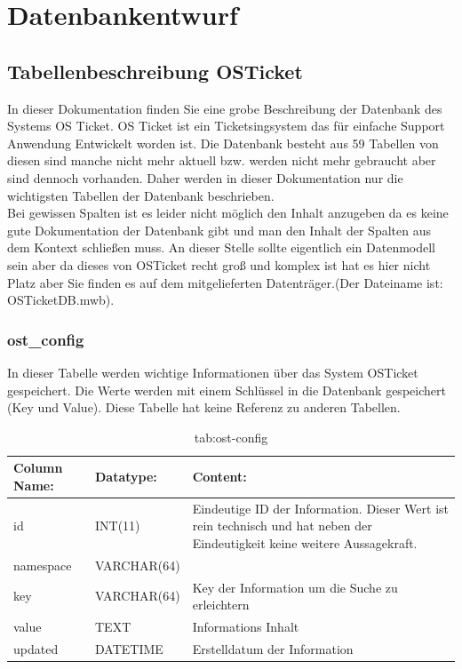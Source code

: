 \newpage
\section{Datenbankentwurf}
\def \currentAuthor{Elias Gabl}

\subsection{Tabellenbeschreibung OSTicket}

In dieser Dokumentation finden Sie eine grobe Beschreibung der Datenbank des Systems OS Ticket. OS Ticket ist ein Ticketsingsystem das für einfache Support Anwendung Entwickelt worden ist. Die Datenbank besteht aus 59 Tabellen von diesen sind manche nicht mehr aktuell bzw. werden nicht mehr gebraucht aber sind dennoch vorhanden. Daher werden in dieser Dokumentation nur die wichtigsten Tabellen der Datenbank beschrieben.\\
Bei gewissen Spalten ist es leider nicht möglich den Inhalt anzugeben da es keine gute Dokumentation der Datenbank gibt und man den Inhalt der Spalten aus dem Kontext schließen muss.
\newline
\newline
An dieser Stelle sollte eigentlich ein Datenmodell sein aber da dieses von OSTicket recht groß und komplex ist hat es hier nicht Platz aber Sie finden es auf dem mitgelieferten Datenträger.(Der Dateiname ist: OSTicketDB.mwb).

\subsubsection{ost\_config}

In dieser Tabelle werden wichtige Informationen über das System OSTicket gespeichert. Die Werte werden mit einem Schlüssel in die Datenbank gespeichert (Key und Value).
Diese Tabelle hat keine Referenz zu anderen Tabellen.

\begin{table}[h]
	\begin{tabular}{|p{3.5cm}|p{4cm}|p{6.2cm}|}
		\hline
		\textbf{Column Name:} & \textbf{Datatype:} & \textbf{Content:}\\
		\hline
		id & INT(11) & Eindeutige ID der Information. Dieser Wert ist rein technisch und hat  neben der Eindeutigkeit keine weitere 
		Aussagekraft. \\
		\hline
		namespace & VARCHAR(64) & \\
		\hline
		key & VARCHAR(64) & Key der Information um die Suche zu erleichtern\\
		\hline
		value & TEXT & Informations Inhalt\\
		\hline
		updated & DATETIME & Erstelldatum der Information\\
		\hline
	\end{tabular}
	\caption{tab:ost-config}
\end{table}
\label{tab:ost_config}
\newpage



